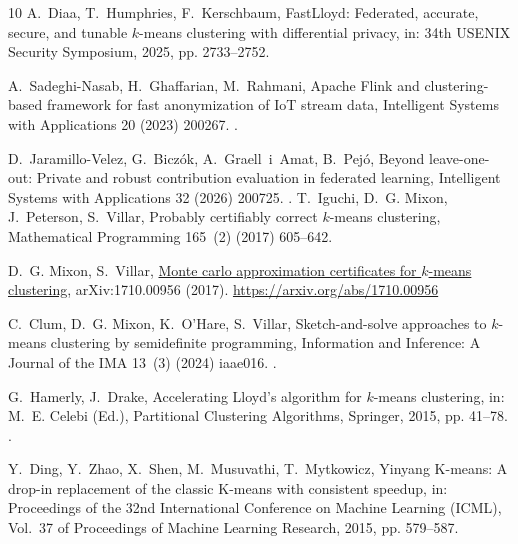 \documentclass[5p,times,twocolumn]{elsarticle}
\begin{document}
\begin{thebibliography}{10}
A.~Diaa, T.~Humphries, F.~Kerschbaum, {FastLloyd}: Federated, accurate, secure, and tunable $k$-means clustering with differential privacy, in: 34th USENIX Security Symposium, 2025, pp. 2733--2752.

A.~Sadeghi-Nasab, H.~Ghaffarian, M.~Rahmani, Apache {Flink} and clustering-based framework for fast anonymization of {IoT} stream data, Intelligent Systems with Applications 20 (2023) 200267. \newblock \href {https://doi.org/10.1016/j.iswa.2023.200267} {}.

D.~Jaramillo-Velez, G.~Bicz{\'o}k, A.~Graell~i~Amat, B.~Pej{\'o}, Beyond leave-one-out: Private and robust contribution evaluation in federated learning, Intelligent Systems with Applications 32 (2026) 200725. \newblock \href {https://doi.org/10.1016/j.iswa.2026.200725} {}.
T.~Iguchi, D.~G. Mixon, J.~Peterson, S.~Villar, Probably certifiably correct $k$-means clustering, Mathematical Programming 165~(2) (2017) 605--642.

D.~G. Mixon, S.~Villar, \href{https://arxiv.org/abs/1710.00956}{Monte carlo
  approximation certificates for $k$-means clustering}, arXiv:1710.00956
  (2017).
\newline\urlprefix\url{https://arxiv.org/abs/1710.00956}

C.~Clum, D.~G. Mixon, K.~O'Hare, S.~Villar, Sketch-and-solve approaches to $k$-means clustering by semidefinite programming, Information and Inference: A Journal of the IMA 13~(3) (2024) iaae016. \newblock \href {https://doi.org/10.1093/imaiai/iaae016} {}.


G.~Hamerly, J.~Drake, Accelerating {Lloyd's} algorithm for $k$-means clustering, in: M.~E. Celebi (Ed.), Partitional Clustering Algorithms, Springer, 2015, pp. 41--78. \newblock \href {https://doi.org/10.1007/978-3-319-09259-1_2} {}.

Y.~Ding, Y.~Zhao, X.~Shen, M.~Musuvathi, T.~Mytkowicz, Yinyang {K}-means: A drop-in replacement of the classic {K}-means with consistent speedup, in: Proceedings of the 32nd International Conference on Machine Learning (ICML), Vol.~37 of Proceedings of Machine Learning Research, 2015, pp. 579--587.


\end{thebibliography}
\end{document}
